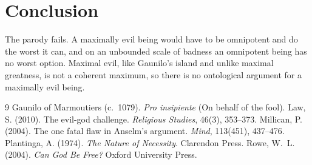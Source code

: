\documentclass{situationist-preprint}
\begin{document}
\section{Conclusion}

The parody fails. A maximally evil being would have to be omnipotent and do the worst it can, and on an unbounded scale of badness an omnipotent being has no worst option. Maximal evil, like Gaunilo's island and unlike maximal greatness, is not a coherent maximum, so there is no ontological argument for a maximally evil being.

\begin{thebibliography}{9}\small
{} Gaunilo of Marmoutiers (c.~1079). \emph{Pro insipiente} (On behalf of the fool).
 Law, S. (2010). The evil-god challenge. \emph{Religious Studies}, 46(3), 353--373.
 Millican, P. (2004). The one fatal flaw in Anselm's argument. \emph{Mind}, 113(451), 437--476.
 Plantinga, A. (1974). \emph{The Nature of Necessity}. Clarendon Press.
 Rowe, W.~L. (2004). \emph{Can God Be Free?} Oxford University Press.
\end{thebibliography}
\end{document}

